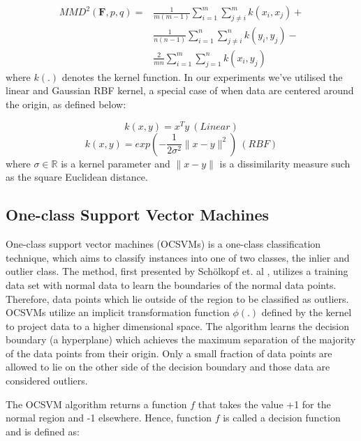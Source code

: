 \documentclass{mpaper}
\begin{document}
\begin{equation}
\begin{aligned}
	MMD^2\left(\mathbf{F},p,q\right) = &\frac{1}{m(m-1)}\sum_{i=1}^{m}\sum_{j\neq i}^{m}k\left(x_i,x_j\right) + \\
	& \frac{1}{n(n-1)}\sum_{i=1}^{n}\sum_{j\neq i}^{n}k\left(y_i,y_j\right) - \\
	& \frac{2}{mn}\sum_{i=1}^{m}\sum_{j=1}^{n}k\left(x_i,y_j\right) 
\end{aligned}
\end{equation}
where $k(.)$ denotes the kernel function. In our experiments we've utilised the linear and Gaussian RBF kernel, a special case of when data are centered around the origin, as defined below:

\begin{equation}\label{eqn:linear}
    k(x,y) = x^Ty\ (Linear)
\end{equation}
\begin{equation}\label{eqn:rbf}
    k(x,y) = exp\left(-\frac{1}{2\sigma^2}\parallel x - y \parallel^2\right)\ (RBF)
\end{equation}
where $\sigma \in \mathbb{R}$ is a kernel parameter and $\parallel x - y\parallel$ is a dissimilarity measure such as the square Euclidean distance. 

\subsection{One-class Support Vector Machines}

One-class support vector machines (OCSVMs) is a one-class classification technique, which aims to classify instances into one of two classes, the inlier and outlier class. The method, first presented by Schölkopf et. al \cite{OriginalOCSVM},  utilizes a training data set with normal data to learn the boundaries of the normal data points. Therefore, data points which lie outside of the region to be classified as outliers. OCSVMs utilize an implicit transformation function $\phi\left(.\right)$ defined by the kernel to project data to a higher dimensional space. The algorithm learns the decision boundary (a hyperplane) which achieves the maximum separation of the majority of the data points from their origin. Only a small fraction of data points are allowed to lie on the other side of the decision boundary and those data are considered outliers. 

The OCSVM algorithm returns a function $f$ that takes the value +1 for the normal region and -1 elsewhere. Hence, function $f$ is called a decision function and is defined as:
\end{document}
